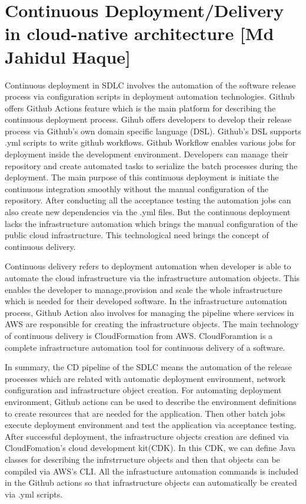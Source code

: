 \section{Continuous Deployment/Delivery in cloud-native architecture [Md Jahidul Haque]}

Continuous deployment in SDLC involves the automation of the software release process via configuration scripts in deployment automation technologies. Github offers Github Actions feature which is the main platform for describing the continuous deployment process. Gihub offers developers to develop their release process via Github's own domain specific language (DSL). Github's DSL supports {{.yml}} scripts to write github workflows. Github Workflow enables various jobs for deployment inside the development environment. Developers can manage their repository and create automated tasks to serialize the batch processes during the deployment. The main purpose of this continuous deployment is initiate the continuous integration smoothly without the manual configuration of the repository. After conducting all the acceptance testing the automation jobs can also create new dependencies via the {{.yml}} files. But the continuous deployment lacks the infrastructure automation which brings the manual configuration of the public cloud infrastructure. This technological need brings the concept of continuous delivery.

Continuous delivery refers to deployment automation when developer is able to automate the cloud infrastructure via the infrastructure automation objects. This enables the developer to manage,provision and scale the whole infrastructure which is needed for their developed software. In the infrastructure automation process, Github Action also involves for managing the pipeline where services in AWS are responsible for creating the infrastructure objects. The main technology of continuous delivery is CloudFormation from AWS. CloudForamtion is a complete infrastructure automation tool for continuous delivery of a software. 

In summary, the CD pipeline of the SDLC means the automation of the release processes which are related with automatic deployment environment, network configuration and infrastructure object creation. For automating deployment environment, Github actions can be used to describe the environment definitions to create resources that are needed for the application. Then other batch jobs execute deployment environment and test the application via acceptance testing. After successful deployment, the infrastructure objects creation are defined via CloudFomation's  cloud development kit(CDK). In this CDK, we can define Java classes for describing the infrstrructure objects and then that objects can be compiled via AWS's CLI. All the infrastucture automation commands is included in the Github actions so that infrastructure objects can automatically be created via {{.yml}} scripts.

